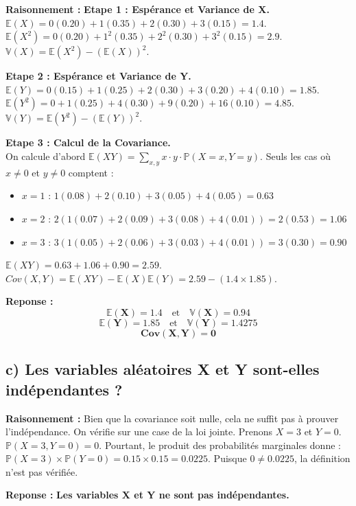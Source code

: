 \documentclass[11pt,a4paper]{article}
\begin{document}
\textbf{Raisonnement :} 
\textbf{Etape 1 : Espérance et Variance de X.}\\
$\mathbb{E}(X) = 0(0.20) + 1(0.35) + 2(0.30) + 3(0.15) = 1.4$.
$\mathbb{E}(X^2) = 0(0.20) + 1^2(0.35) + 2^2(0.30) + 3^2(0.15) = 2.9$.
$\mathbb{V}(X) = \mathbb{E}(X^2) - (\mathbb{E}(X))^2$.

\textbf{Etape 2 : Espérance et Variance de Y.}\\
$\mathbb{E}(Y) = 0(0.15) + 1(0.25) + 2(0.30) + 3(0.20) + 4(0.10) = 1.85$.
$\mathbb{E}(Y^2) = 0 + 1(0.25) + 4(0.30) + 9(0.20) + 16(0.10) = 4.85$.
$\mathbb{V}(Y) = \mathbb{E}(Y^2) - (\mathbb{E}(Y))^2$.

\textbf{Etape 3 : Calcul de la Covariance.}\\
On calcule d'abord $\mathbb{E}(XY) = \sum_{x,y} x \cdot y \cdot \mathbb{P}(X=x, Y=y)$. Seuls les cas où $x \neq 0$ et $y \neq 0$ comptent :
\begin{itemize}
    \item $x=1$ : $1(0.08) + 2(0.10) + 3(0.05) + 4(0.05) = 0.63$
    \item $x=2$ : $2(1(0.07) + 2(0.09) + 3(0.08) + 4(0.01)) = 2(0.53) = 1.06$
    \item $x=3$ : $3(1(0.05) + 2(0.06) + 3(0.03) + 4(0.01)) = 3(0.30) = 0.90$
\end{itemize}
$\mathbb{E}(XY) = 0.63 + 1.06 + 0.90 = 2.59$.
$Cov(X,Y) = \mathbb{E}(XY) - \mathbb{E}(X)\mathbb{E}(Y) = 2.59 - (1.4 \times 1.85)$.

\textbf{Reponse :}
$$ \mathbf{\mathbb{E}(X) = 1.4} \quad \text{et} \quad \mathbf{\mathbb{V}(X) = 0.94} $$
$$ \mathbf{\mathbb{E}(Y) = 1.85} \quad \text{et} \quad \mathbf{\mathbb{V}(Y) = 1.4275} $$
$$ \mathbf{Cov(X,Y) = 0} $$

\subsection*{c) Les variables aléatoires X et Y sont-elles indépendantes ?}

\textbf{Raisonnement :} 
Bien que la covariance soit nulle, cela ne suffit pas à prouver l'indépendance. On vérifie sur une case de la loi jointe. Prenons $X=3$ et $Y=0$.
$\mathbb{P}(X=3, Y=0) = 0$.
Pourtant, le produit des probabilités marginales donne : $\mathbb{P}(X=3) \times \mathbb{P}(Y=0) = 0.15 \times 0.15 = 0.0225$.
Puisque $0 \neq 0.0225$, la définition n'est pas vérifiée.

\textbf{Reponse :} 
\textbf{Les variables X et Y ne sont pas indépendantes.}
\end{document}
